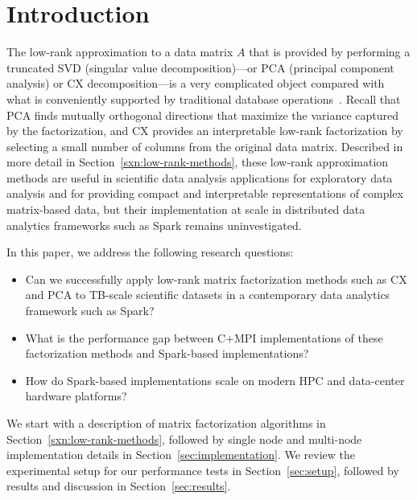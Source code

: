 \section{Introduction}
\label{sec:intro}

The low-rank approximation to a data matrix $A$ that is provided by performing
a truncated SVD (singular value decomposition)---or PCA (principal component
analysis) or CX decomposition---is a very complicated object compared with
what is conveniently supported by traditional database
operations~\cite{Skillicorn07}. Recall that PCA finds mutually orthogonal
directions that maximize the variance captured by the factorization, and CX
provides an interpretable low-rank factorization by selecting a small number of
columns from the original data matrix.  Described in more detail in
Section~\ref{sxn:low-rank-methods}, these low-rank approximation methods are
useful in scientific data analysis applications for exploratory data analysis
and for providing compact and interpretable representations of complex
matrix-based data, but their implementation at scale in distributed data
analytics frameworks such as Spark remains uninvestigated. 

In this paper, we address the following research questions:
\begin{itemize}
  \item Can we successfully apply low-rank matrix factorization methods such as
    CX and PCA to TB-scale scientific datasets in a contemporary data analytics
    framework such as Spark?

  \item What is the performance gap between C+MPI implementations of these
    factorization methods and Spark-based implementations? 

  \item How do Spark-based implementations scale on modern HPC and data-center
    hardware platforms?
\end{itemize}

We start with a description of matrix factorization algorithms in
Section~\ref{sxn:low-rank-methods}, followed by single node and multi-node
implementation details in Section~\ref{sec:implementation}. We review the
experimental setup for our performance tests in Section~\ref{sec:setup},
followed by results and discussion in Section~\ref{sec:results}.

